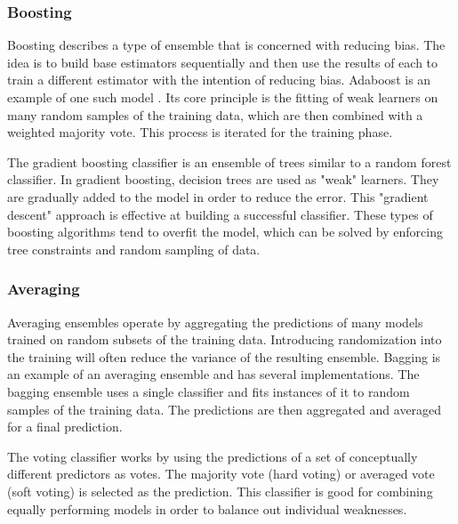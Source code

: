 \subsubsection{Boosting}
Boosting describes a type of ensemble that is concerned with reducing bias.
The idea is to build base estimators sequentially and then use the results of each to train a different estimator with the intention of reducing bias.
Adaboost is an example of one such model \cite{freund1995desicion}.
Its core principle is the fitting of weak learners on many random samples of the training data, which are then combined with a weighted majority vote. 
This process is iterated for the training phase.



\par
The gradient boosting classifier is an ensemble of trees similar to a random forest classifier.
In gradient boosting, decision trees are used as "weak" learners.
They are gradually added to the model in order to reduce the error.
This "gradient descent" approach is effective at building a successful classifier.
These types of boosting algorithms tend to overfit the model, which can be solved by enforcing tree constraints and random sampling of data.


\subsubsection{Averaging}
Averaging ensembles operate by aggregating the predictions of many models trained on random subsets of the training data.
Introducing randomization into the training will often reduce the variance of the resulting ensemble.
Bagging is an example of an averaging ensemble and has several implementations.
The bagging ensemble uses a single classifier and fits instances of it to random samples of the training data.
The predictions are then aggregated and averaged for a final prediction.

The voting classifier works by using the predictions of a set of conceptually different predictors as votes.
The majority vote (hard voting) or averaged vote (soft voting) is selected as the prediction.
This classifier is good for combining equally performing models in order to balance out individual weaknesses.

